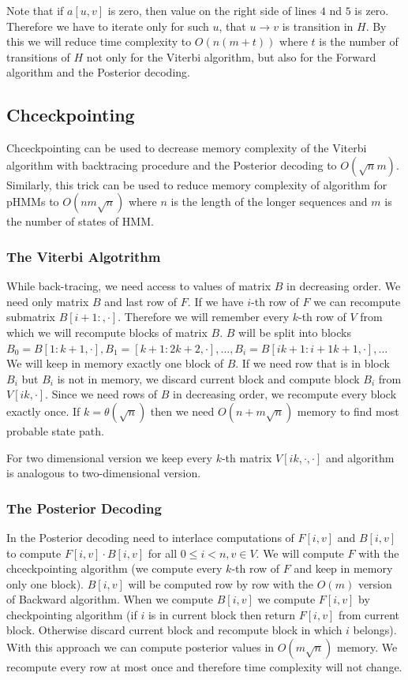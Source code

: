 Note that if $a[u,v]$ is zero, then value on the right side of lines $4$ nd $5$
is zero. Therefore we have to iterate only for such $u$, that $u\to v$ is
transition in $H$. By this we will reduce time complexity to $O(n(m+t))$ where
$t$ is the number of transitions of $H$ not only for the Viterbi algorithm, but
also for the Forward algorithm and the Posterior decoding.


\subsection{Chceckpointing}
\label{SECTION:HMMCHECKPOINTING}
Chceckpointing can be used to decrease memory complexity of the Viterbi
algorithm with backtracing procedure and the Posterior decoding to $O(\sqrt n
m)$.  Similarly, this trick can be used to reduce memory complexity of algorithm
for pHMMs to $O(nm\sqrt n )$ where $n$ is the length of the longer sequences and
$m$ is the number of states of HMM.

\subsubsection{The Viterbi Algotrithm}
While back-tracing, we need access to values of matrix $B$ in decreasing order.
We need only matrix $B$ and last row of $F$. If we have $i$-th row of $F$ we can
recompute submatrix $B[i+1:,\cdot]$. Therefore we will remember every $k$-th row
of $V$ from which we will recompute blocks of matrix $B$. $B$ will be split into
blocks
$B_0=B[1:k+1,\cdot],B_1=[k+1:2k+2,\cdot],\dots,B_i=B[ik+1:{i+1}k+1,\cdot],\dots$
We will keep in memory exactly one block of $B$. If we need row that is in block
$B_i$ but $B_i$ is not in memory, we discard current block and compute block
$B_i$ from $V[ik,\cdot]$. Since we need rows of $B$ in decreasing order, we
recompute every block exactly once. If $k=\theta(\sqrt n)$ then we need
$O(n+m\sqrt n)$ memory to find most probable state path.

For two dimensional version we keep every $k$-th matrix $V[ik,\cdot,\cdot]$ and
algorithm is analogous to two-dimensional version.

\subsubsection{The Posterior Decoding}

In the Posterior decoding need to interlace computations of $F[i,v]$ and
$B[i,v]$ to compute $F[i,v]\cdot B[i,v]$ for all $0\leq i<n,v\in V$. We will
compute $F$ with the chceckpointing algorithm (we compute every $k$-th row of
$F$ and keep in memory only one block).  $B[i,v]$ will be computed row by row
with the $O(m)$ version of Backward algorithm. When we compute $B[i,v]$ we
compute $F[i,v]$ by checkpointing algorithm (if $i$ is in current block then
return $F[i,v]$ from current block. Otherwise discard current block and
recompute block in which $i$ belongs). With this approach we can compute
posterior values in $O(m\sqrt n)$ memory. We recompute every row at most once
and therefore time complexity will not change.


